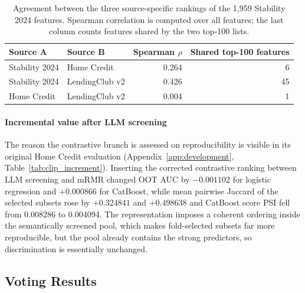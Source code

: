 \documentclass[preprint,12pt]{elsarticle}
\begin{document}
\begin{table}[htbp]
\centering
\footnotesize
\begin{threeparttable}
\caption{Agreement between the three source-specific rankings of the 1,959 Stability 2024 features. Spearman correlation is computed over all features; the last column counts features shared by the two top-100 lists.}
\label{tab:clip_agreement}
\begin{tabular}{@{}llrr@{}}
\toprule
Source A & Source B & Spearman $\rho$ & Shared top-100 features \\
\midrule
Stability 2024 & Home Credit & 0.264 & 6 \\
Stability 2024 & LendingClub v2 & 0.426 & 45 \\
Home Credit & LendingClub v2 & 0.004 & 1 \\
\bottomrule
\end{tabular}
\end{threeparttable}
\end{table}

\paragraph{Incremental value after LLM screening}
The reason the contrastive branch is assessed on reproducibility is visible in its original Home Credit evaluation (Appendix~\ref{app:development}, Table~\ref{tab:clip_increment}). Inserting the corrected contrastive ranking between LLM screening and mRMR changed OOT AUC by $-0.001102$ for logistic regression and $+0.000866$ for CatBoost, while mean pairwise Jaccard of the selected subsets rose by $+0.324841$ and $+0.498638$ and CatBoost score PSI fell from 0.008286 to 0.004094. The representation imposes a coherent ordering inside the semantically screened pool, which makes fold-selected subsets far more reproducible, but the pool already contains the strong predictors, so discrimination is essentially unchanged.

\subsection{Voting Results}
\label{subsec:voting_results}
\end{document}
